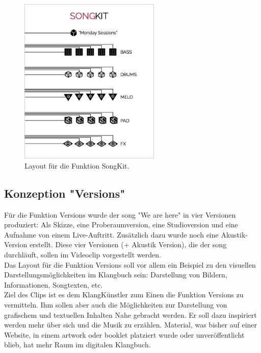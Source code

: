 \begin{figure}[H]
\centering
\includegraphics[width=0.6\textwidth]{grafiken/songkit.png}
\caption{Layout für die Funktion SongKit.}
\end{figure}

\vspace{0.5cm}




\subsection{Konzeption "Versions"}
Für die Funktion Versions wurde der \gls{song} "We are here" in vier Versionen produziert: Als Skizze, eine Proberaumversion, eine Studioversion und eine Aufnahme von einem Live-Auftritt. Zusätzlich dazu wurde noch eine Akustik-Version erstellt. Diese vier Versionen (+ Akustik Version), die der \gls{song} durchläuft, sollen im Videoclip vorgestellt werden.\\ 

Das Layout für die Funktion Versions soll vor allem ein Beispiel zu den visuellen Darstellungsmöglichkeiten im Klangbuch sein: Darstellung von Bildern, Informationen, Songtexten, etc.\\

Ziel des Clips ist es dem KlangKünstler zum Einen die Funktion Versions zu vermitteln. Ihm sollen aber auch die Möglichkeiten zur Darstellung von grafischem und textuellen Inhalten Nahe gebracht werden. Er soll dazu inspiriert werden mehr über sich und die Musik zu erzählen. Material, was bisher auf einer Website, in einem \gls{artwork} oder \gls{booklet} platziert wurde oder unveröffentlicht blieb, hat mehr Raum im digitalen Klangbuch.\\


